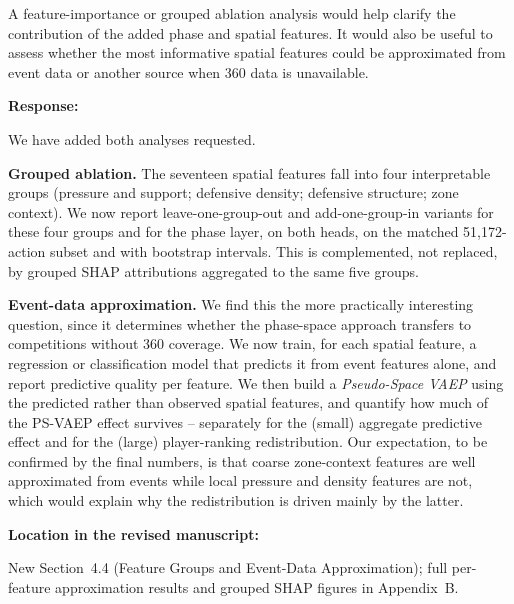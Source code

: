 \documentclass[11pt,a4paper]{article}
\newcommand{\newwork}[1]{\textcolor{statusnew}{#1}}
\newcommand{\response}[2]{%
  \begin{responsebox}
  \textbf{Response:}

  #1
  \end{responsebox}
  \begin{locationbox}
  \textbf{Location in the revised manuscript:}

  #2
  \end{locationbox}
}
\begin{document}
\begin{reviewbox}[Comment 4]
A feature-importance or grouped ablation analysis would help clarify the contribution of the added phase and spatial features. It would also be useful to assess whether the most informative spatial features could be approximated from event data or another source when 360 data is unavailable.
\end{reviewbox}
\response{We have added both analyses requested.

\newwork{\textbf{Grouped ablation.} The seventeen spatial features fall into four interpretable groups (pressure and support; defensive density; defensive structure; zone context). We now report leave-one-group-out and add-one-group-in variants for these four groups and for the phase layer, on both heads, on the matched 51{,}172-action subset and with bootstrap intervals. This is complemented, not replaced, by grouped SHAP attributions aggregated to the same five groups.}

\newwork{\textbf{Event-data approximation.} We find this the more practically interesting question, since it determines whether the phase-space approach transfers to competitions without 360 coverage. We now train, for each spatial feature, a regression or classification model that predicts it from event features alone, and report predictive quality per feature. We then build a \emph{Pseudo-Space VAEP} using the predicted rather than observed spatial features, and quantify how much of the PS-VAEP effect survives -- separately for the (small) aggregate predictive effect and for the (large) player-ranking redistribution. Our expectation, to be confirmed by the final numbers, is that coarse zone-context features are well approximated from events while local pressure and density features are not, which would explain why the redistribution is driven mainly by the latter.}}{New Section~4.4 (Feature Groups and Event-Data Approximation); full per-feature approximation results and grouped SHAP figures in Appendix~B.}
\end{document}

